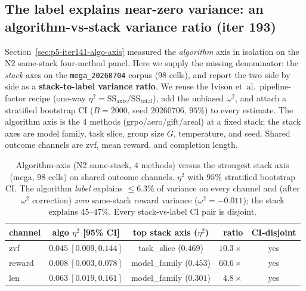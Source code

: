 \subsection{The label explains near-zero variance: an algorithm-vs-stack
variance ratio (iter 193)}
\label{sec:p5-iter193-ratio}

Section~\ref{sec:p5-iter141-algo-axis} measured the \emph{algorithm} axis in
isolation on the N2 same-stack four-method panel. Here we supply the missing
denominator: the \emph{stack} axes on the \texttt{mega\_20260704} corpus
($98$ cells), and report the two side by side as a
\textbf{stack-to-label variance ratio}. We reuse the Ivison
et~al.\ pipeline-factor recipe (one-way $\eta^2 = \mathrm{SS}_{\text{axis}} /
\mathrm{SS}_{\text{total}}$), add the unbiased $\omega^2$, and attach a
stratified bootstrap CI ($B{=}2000$, seed $20260706$, $95\%$) to every estimate.
The algorithm axis is the $4$ methods (grpo/aero/gift/areal) at a fixed stack;
the stack axes are model family, task slice, group size $G$, temperature, and
seed. Shared outcome channels are zvf, mean reward, and completion length.

\begin{table}[t]
\centering\small
\caption{Algorithm-axis (N2 same-stack, $4$ methods) versus the strongest
stack axis (mega, $98$ cells) on shared outcome channels. $\eta^2$ with
$95\%$ stratified bootstrap CI. The algorithm \emph{label} explains
$\le 6.3\%$ of variance on every channel and (after $\omega^2$ correction)
\emph{zero} same-stack reward variance ($\omega^2 = -0.011$); the stack
explains $45$--$47\%$. Every stack-vs-label CI pair is disjoint.}
\label{tab:p5-iter193-ratio}
\begin{tabular}{lccrc}
\toprule
channel & algo $\eta^2$ [95\% CI] & top stack axis ($\eta^2$) & ratio & CI-disjoint \\
\midrule
zvf    & $0.045\ [0.009,0.144]$ & task\_slice ($0.469$)   & $10.3\times$ & yes \\
reward & $0.008\ [0.003,0.078]$ & model\_family ($0.453$) & $60.6\times$ & yes \\
len    & $0.063\ [0.019,0.161]$ & model\_family ($0.301$) & $4.8\times$  & yes \\
\bottomrule
\end{tabular}
\end{table}

